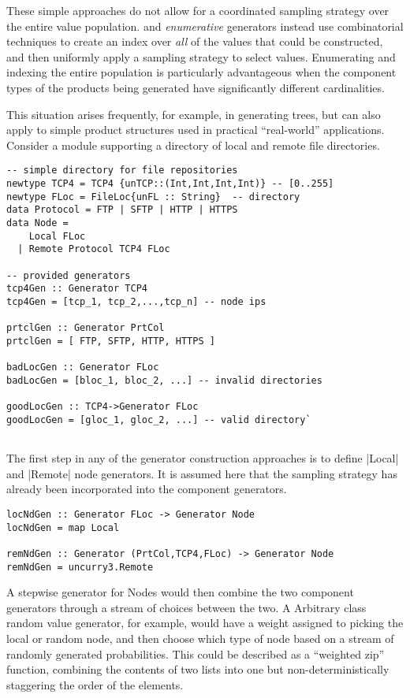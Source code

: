 These simple approaches do not allow for a coordinated sampling strategy over the entire value population.
\FEAT and \GC \emph{enumerative} generators instead use combinatorial techniques to
create an index over \emph{all} of the values that could be constructed,
and then uniformly apply a sampling strategy to select values.
Enumerating and indexing the entire population
is particularly advantageous when
the component types of the products being generated have significantly different cardinalities.

This situation arises frequently, for example, in generating trees,
but can also apply to simple product structures used in practical ``real-world'' applications.
Consider a module supporting a directory of local and remote file directories.

\begin{lstlisting}
-- simple directory for file repositories
newtype TCP4 = TCP4 {unTCP::(Int,Int,Int,Int)} -- [0..255] 
newtype FLoc = FileLoc{unFL :: String} 	-- directory
data Protocol = FTP | SFTP | HTTP | HTTPS
data Node = 
    Local FLoc 
  | Remote Protocol TCP4 FLoc 

-- provided generators
tcp4Gen :: Generator TCP4
tcp4Gen = [tcp_1, tcp_2,...,tcp_n] -- node ips

prtclGen :: Generator PrtCol
prtclGen = [ FTP, SFTP, HTTP, HTTPS ]

badLocGen :: Generator FLoc
badLocGen = [bloc_1, bloc_2, ...] -- invalid directories

goodLocGen :: TCP4->Generator FLoc
goodLocGen = [gloc_1, gloc_2, ...] -- valid directory`
 
\end{lstlisting}

The first step in any of the generator construction approaches
is to define |Local| and |Remote| node generators.
It is assumed here that the sampling strategy has already been incorporated
into the component generators.

\begin{lstlisting}
locNdGen :: Generator FLoc -> Generator Node
locNdGen = map Local 

remNdGen :: Generator (PrtCol,TCP4,FLoc) -> Generator Node
remNdGen = uncurry3.Remote

\end{lstlisting}

A stepwise generator for Nodes
would then combine the two component generators
through a stream of choices between the two.
A \QC Arbitrary class random value generator, for example,
would have a weight assigned to picking the local or random node,
and then choose which type of node based on a stream of randomly generated probabilities.
This could be described as a ``weighted zip'' function,
combining the contents of two lists into one but 
non-deterministically staggering the order of the elements.

